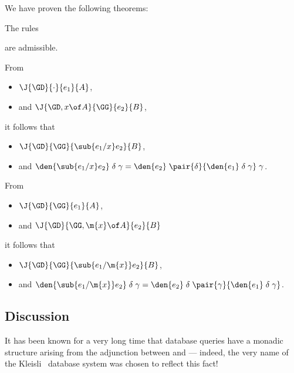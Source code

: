 We have proven the following theorems:

\begin{theorem}
  The rules 
  are admissible.
\end{theorem}

\begin{theorem}
  From
  \begin{itemize}
  \item $\J{\GD}{\cdot}{e_1}{A}$,
  \item and $\J{\GD,x \of A}{\GG}{e_2}{B}$,
  \end{itemize}
  it follows that
  \begin{itemize}
  \item $\J{\GD}{\GG}{\sub{e_1/x}e_2}{B}$,
  \item and $\den{\sub{e_1/x} e_2} \dg = \den{e_2} \;\pair{\delta}{\den{e_1}\dg}
    \;\gamma$.
  \end{itemize}
\end{theorem}

\begin{theorem}
  From
  \begin{itemize}
  \item $\J{\GD}{\GG}{e_1}{A}$,
  \item and $\J{\GD}{\GG,\m{x}\of A}{e_2}{B}$
  \end{itemize}
  it follows that
  \begin{itemize}
  \item $\J{\GD}{\GG}{\sub{e_1/\m{x}}e_2}{B}$,
  \item and $\den{\sub{e_1/\m{x}} e_2} \dg = \den{e_2} \;\delta
    \;\pair{\gamma}{\den{e_1} \dg}$.
  \end{itemize}
\end{theorem}

\subsection{Discussion}
It has been known for a very long time that database queries have a
monadic structure arising from the adjunction between \cSet and \cSL
--- indeed, the very name of the Kleisli~\cite{kleisli} database
system was chosen to reflect this fact! 

